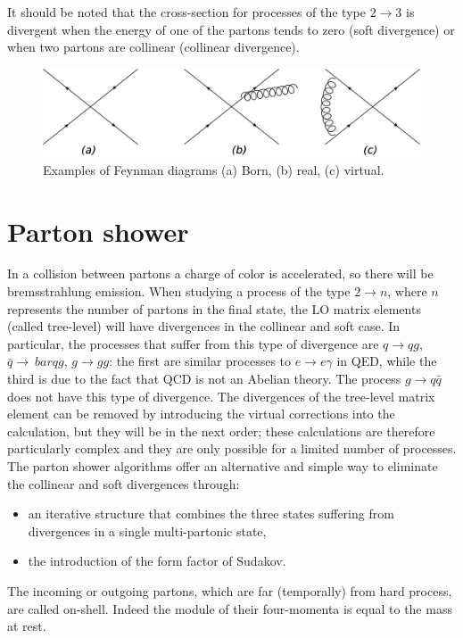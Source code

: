 It should be noted that the cross-section for processes of the type $ 2 \rightarrow 3 $ is divergent when the energy of one of the partons tends to zero (soft divergence) or when two partons are collinear (collinear divergence).
\begin{figure}
\centering
\includegraphics[scale=0.22]{../Cap3/Fig_MC/nlo2}
\caption{ Examples of Feynman diagrams (a)  Born, (b) real, (c) virtual. }
\label{nlofig}
\end{figure}
\section{Parton shower}
\label{ps}
In a collision between partons a charge of color is accelerated, so there will be bremsstrahlung emission. When studying a process of the type $ 2 \rightarrow n $, where $ n $ represents the number of partons in the final state, the LO matrix elements (called tree-level) will have divergences in the collinear  and 
soft case. In particular, the processes that suffer from this type of divergence are $ q \rightarrow qg $, $ \bar{q} \rightarrow \ bar{q} g $, $ g \rightarrow gg $: the first are similar processes to $ e \rightarrow e \gamma $ in QED, while the third is due to the fact that QCD is not an Abelian theory. The process $ g \rightarrow q \bar {q} $ does not have this type of divergence.
The divergences of the tree-level matrix element can be removed by introducing the virtual corrections into the calculation, but they will be in the next order; these calculations are therefore particularly complex and they are only possible for a limited number of processes. The parton shower \cite{Sjostrand:2006su} algorithms offer an alternative and simple way to eliminate the collinear and soft divergences through:
\begin{itemize}
\item an iterative structure that combines the three states suffering from divergences in a single multi-partonic state,
\item the introduction of the form factor of Sudakov.
\end{itemize}
The incoming or outgoing partons, which are far (temporally) from hard process, are called on-shell. Indeed the module of their four-momenta   is equal to the mass at rest.

